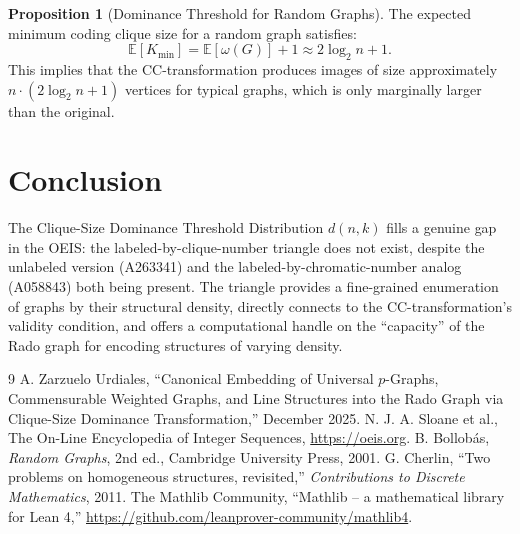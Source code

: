 \documentclass[11pt,a4paper]{article}
\theoremstyle{definition}
\newtheorem{proposition}{Proposition}[section]
\begin{document}
\begin{proposition}[Dominance Threshold for Random Graphs]
The expected minimum coding clique size for a random graph satisfies:
\[
\mathbb{E}[K_{\min}] = \mathbb{E}[\omega(G)] + 1 \approx 2\log_2 n + 1.
\]
This implies that the CC-transformation produces images of size approximately $n \cdot (2\log_2 n + 1)$ vertices for typical graphs, which is only marginally larger than the original.
\end{proposition}

\section{Conclusion}

The Clique-Size Dominance Threshold Distribution $d(n, k)$ fills a genuine gap in the OEIS: the labeled-by-clique-number triangle does not exist, despite the unlabeled version (A263341) and the labeled-by-chromatic-number analog (A058843) both being present. The triangle provides a fine-grained enumeration of graphs by their structural density, directly connects to the CC-transformation's validity condition, and offers a computational handle on the ``capacity'' of the Rado graph for encoding structures of varying density.

\begin{thebibliography}{9}
 A. Zarzuelo Urdiales, ``Canonical Embedding of Universal $p$-Graphs, Commensurable Weighted Graphs, and Line Structures into the Rado Graph via Clique-Size Dominance Transformation,'' December 2025.
 N. J. A. Sloane et al., The On-Line Encyclopedia of Integer Sequences, \url{https://oeis.org}.
 B. Bollob\'as, \textit{Random Graphs}, 2nd ed., Cambridge University Press, 2001.
 G. Cherlin, ``Two problems on homogeneous structures, revisited,'' \textit{Contributions to Discrete Mathematics}, 2011.
 The Mathlib Community, ``Mathlib -- a mathematical library for Lean 4,'' \url{https://github.com/leanprover-community/mathlib4}.
\end{thebibliography}
\end{document}
